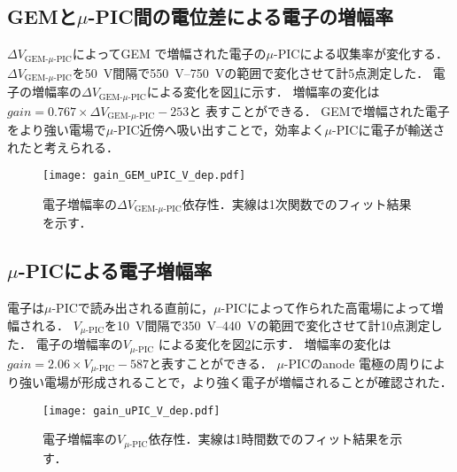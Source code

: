 \documentclass[../master]{subfiles}
\begin{document}

\subsection{GEMと$\mu$-PIC間の電位差による電子の増幅率}
$\Delta V_{\text{GEM-}\mu\text{-PIC}}$によってGEM で増幅された電子の$\mu$-PICによる収集率が変化する．
$\Delta V_{\text{GEM-}\mu\text{-PIC}}$を\SI{50}{\volt}間隔で\SIrange{550}{750}{\volt}の範囲で変化させて計5点測定した．
電子の増幅率の$\Delta V_{\text{GEM-}\mu\text{-PIC}}$による変化を図\ref{fig::gain_GEM_uPIC_V_dep}に示す．
増幅率の変化は$\mathit{gain} = 0.767\times{\Delta V_{\text{GEM-}\mu\text{-PIC}}}-253$と
表すことができる．
GEMで増幅された電子をより強い電場で$\mu$-PIC近傍へ吸い出すことで，効率よく$\mu$-PICに電子が輸送されたと考えられる．
\begin{figure}
  \centering
  \texttt{[image: gain\_GEM\_uPIC\_V\_dep.pdf]}
  \caption{電子増幅率の$\Delta V_{\text{GEM-}\mu\text{-PIC}}$依存性．実線は1次関数でのフィット結果を示す．}
  \label{fig::gain_GEM_uPIC_V_dep}
\end{figure}

\subsection{$\mu$-PICによる電子増幅率}
電子は$\mu$-PICで読み出される直前に，$\mu$-PICによって作られた高電場によって増幅される．
$V_{\mu\text{-PIC}}$を\SI{10}{\volt}間隔で\SIrange{350}{440}{\volt}の範囲で変化させて計10点測定した．
電子の増幅率の$V_{\mu\text{-PIC}}$ による変化を図\ref{fig::gain_uPIC_V_dep}に示す．
増幅率の変化は$\mathit{gain} = 2.06\times{V_{\mu\text{-PIC}}}-587$と表すことができる．
$\mu$-PICのanode 電極の周りにより強い電場が形成されることで，より強く電子が増幅されることが確認された．
\begin{figure}
  \centering
  \texttt{[image: gain\_uPIC\_V\_dep.pdf]}
  \caption{電子増幅率の$V_{\mu\text{-PIC}}$依存性．実線は1時間数でのフィット結果を示す．}
  \label{fig::gain_uPIC_V_dep}
\end{figure}
\end{document}
